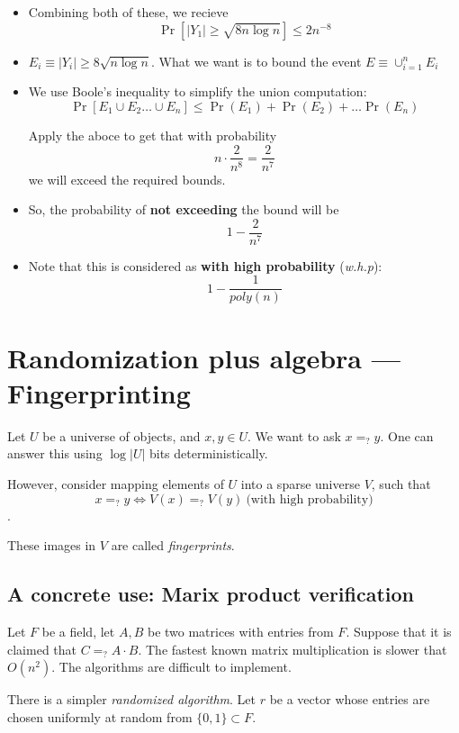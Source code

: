 \begin{itemize}
    \item Combining both of these, we recieve 
    $$
    \Pr[|Y_1| \geq \sqrt{8 n \log n}] \leq 2 n^{-8}
    $$


    \item $E_i \equiv |Y_i| \geq 8 \sqrt{n \log n}$. What we want is to bound
    the event $E \equiv \cup_{i=1}^n E_i$

    \item We use Boole's inequality to simplify the union computation:
    $$\Pr[E_1 \cup E_2 \dots \cup E_n] \leq \Pr(E_1) + \Pr(E_2) + \dots \Pr(E_n)$$


    Apply the aboce to get that with probability $$n \cdot \frac{2}{n^8} = \frac{2}{n^7}$$
    we will exceed the required bounds.

    \item So, the probability of \textbf{not exceeding} the bound will be
    $$1 - \frac{2}{n^7}$$

    \item Note that this is considered as \textbf{with high probability} (\textit{w.h.p}):
    $$ 1 - \frac{1}{poly(n)} $$
\end{itemize}

\section{Randomization plus algebra --- Fingerprinting}

Let $U$ be a universe of objects, and $x, y \in U$. We want to ask $x =_? y$.
One can answer this using $\log |U|$ bits deterministically.

However, consider mapping elements of $U$ into a sparse universe $V$, such that
$$x =_? y \iff V(x) =_? V(y)~\text{(with high probability)}$$.

These images in $V$ are called \textit{fingerprints}.

\subsection{A concrete use: Marix product verification}
Let $F$ be a field, let $A, B$ be two matrices with entries from $F$. Suppose
that it is claimed that $C =_? A \cdot B$. The fastest known matrix
multiplication is slower that $O(n^2)$. The algorithms are difficult to implement.

There is a simpler \textit{randomized algorithm}. Let $r$ be a vector whose
entries are chosen uniformly at random from $\{0, 1\} \subset F$.

